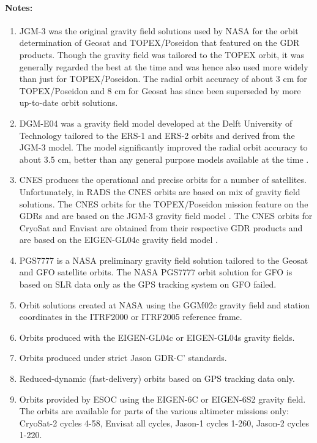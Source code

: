 \documentclass[a4paper,11pt,openany,natbib,nomargin]{thesis}
\newenvironment{notes}[1][Notes:]{\FloatBarrier\paragraph{#1}\begin{enumerate}}{\end{enumerate}}
\begin{document}
\begin{notes}
\item JGM-3 \citep{tapley1996} was the original gravity field solutions used by NASA for the orbit determination of Geosat and TOPEX/Poseidon that featured on the GDR products. Though the gravity field was tailored to the TOPEX orbit, it was generally regarded the best at the time and was hence also used more widely than just for TOPEX/Poseidon. The radial orbit accuracy of about 3 cm for TOPEX/Poseidon and 8 cm for Geosat has since been superseded by more up-to-date orbit solutions.\label{item:alt_jgm3}
\item DGM-E04 was a gravity field model developed at the Delft University of Technology tailored to the ERS-1 and ERS-2 orbits and derived from the JGM-3 model. The model significantly improved the radial orbit accuracy to about 3.5 cm, better than any general purpose models available at the time \citep{scharroo1998a}.\label{item:alt_dgme04}
\item CNES produces the operational and precise orbits for a number of satellites. Unfortunately, in RADS the CNES orbits are based on mix of gravity field solutions. The CNES orbits for the TOPEX/Poseidon mission feature on the GDRs and are based on the JGM-3 gravity field model \citep{tapley1996}. The CNES orbits for CryoSat and Envisat are obtained from their respective GDR products and are based on the EIGEN-GL04c gravity field model \citep{ablain2008}.\label{item:alt_cnes}
\item PGS7777 is a NASA preliminary gravity field solution tailored to the Geosat and GFO satellite orbits. The NASA PGS7777 orbit solution for GFO \citep{lemoine2006a} is based on SLR data only as the GPS tracking system on GFO failed.\label{item:alt_pgs7777}
\item Orbit solutions created at NASA using the GGM02c gravity field and station coordinates in the ITRF2000 or ITRF2005 reference frame.\label{item:alt_ggm02c}
\item Orbits produced with the EIGEN-GL04c or EIGEN-GL04s gravity fields.\label{item:alt_eiggl04s}
\item Orbits produced under strict Jason GDR-C' standards.\label{item:alt_gdrcp}
\item Reduced-dynamic (fast-delivery) orbits based on GPS tracking data only.\label{item:alt_gps}
\item Orbits provided by ESOC using the EIGEN-6C or EIGEN-6S2 gravity field. The orbits are available for parts of the various altimeter missions only: CryoSat-2 cycles 4-58, Envisat all cycles, Jason-1 cycles 1-260, Jason-2 cycles 1-220.\label{item:alt_eig6}

\end{notes}
\end{document}
